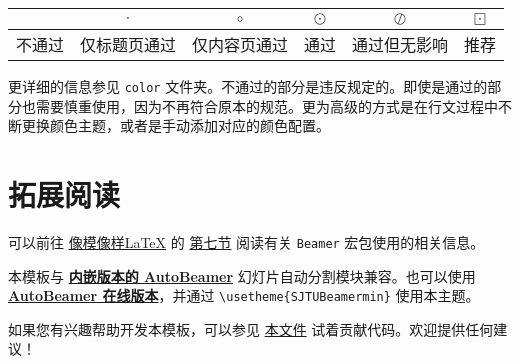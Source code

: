 \documentclass[a4paper,12pt]{article}
\begin{document}
\begin{center}
    \begin{tabular}{|c|c|c|c|c|c|}
        \hline
                & $\cdot$ & $\circ$ & $\odot $ & $\oslash  $ & $\boxdot$ \\
        \hline
        不通过  &  仅标题页通过 & 仅内容页通过 & 通过 & 通过但无影响 & 推荐 \\
        \hline 
    \end{tabular}
\end{center}

更详细的信息参见 \verb"color" 文件夹。不通过的部分是违反规定的。即使是通过的部分也需要慎重使用，因为不再符合原本的规范。更为高级的方式是在行文过程中不断更换颜色主题，或者是手动添加对应的颜色配置。

\section{拓展阅读}
可以前往 \href{https://logcreative.github.io/LaTeXSparkle/}{像模像样\LaTeX} 的 \href{https://logcreative.github.io/LaTeXSparkle/src/art/chapter07.html}{第七节} 阅读有关 \verb"Beamer" 宏包使用的相关信息。

本模板与 \href{https://github.com/LogCreative/AutoBeamer/tree/pkg}{\textbf{内嵌版本的 \textsf{AutoBeamer}}} 幻灯片自动分割模块兼容。也可以使用 \href{https://logcreative.github.io/AutoBeamer/}{\textbf{\textsf{AutoBeamer} 在线版本}}，并通过 \verb"\usetheme{SJTUBeamermin}" 使用本主题。

如果您有兴趣帮助开发本模板，可以参见 \href{https://github.com/LogCreative/SJTUBeamermin/blob/main/CONTRIBUTING.md}{本文件} 试着贡献代码。欢迎提供任何建议！




\end{document}
